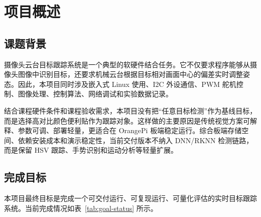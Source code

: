 \documentclass[
  oneside,
  degree=bachelor,
  field=science,
  fullwidthstop=circle,
  fontset=windows,
  times=false,
  minted=false,
  biblatex=false,
  algo=algpseudocode,
]{tongjithesis}
\begin{document}
\clearpage
\tableofcontents
\cleardoublepage

\mainmatter

\chapter{项目概述}

\section{课题背景}

摄像头云台目标跟踪系统是一个典型的软硬件结合任务。它不仅要求程序能够从摄像头图像中识别目标，还要求机械云台根据目标相对画面中心的偏差实时调整姿态。因此，本项目同时涉及嵌入式 Linux 使用、I2C 外设通信、PWM 舵机控制、图像处理、控制算法、网络调试和实验数据记录。

结合课程硬件条件和课程验收需求，本项目没有把“任意目标检测”作为基线目标，而是选择高对比颜色便利贴作为跟踪对象。这样做的主要原因是传统视觉方案可解释、参数可调、部署轻量，更适合在 OrangePi 板端稳定运行。综合板端存储空间、依赖安装成本和演示稳定性，当前交付版本不纳入 DNN/RKNN 检测链路，而是保留 HSV 跟踪、手势识别和运动分析等轻量扩展。

\section{完成目标}

本项目最终目标是完成一个可交付运行、可复现运行、可量化评估的实时目标跟踪系统。当前完成情况如表~\ref{tab:goal-status} 所示。
\end{document}
